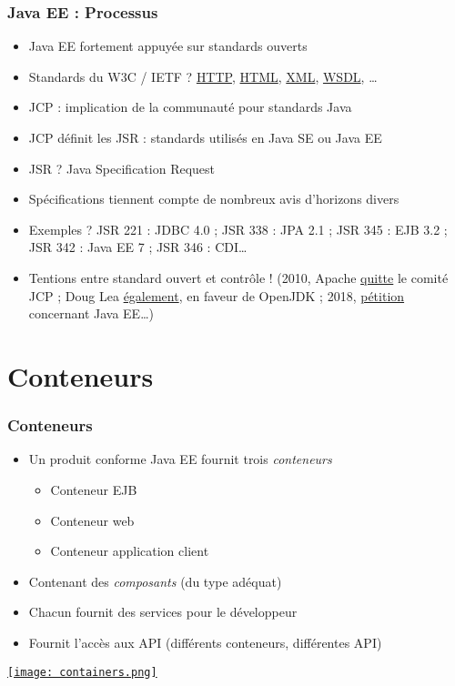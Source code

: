 \documentclass[english, french]{beamer}
\begin{document}
\begin{frame}
	\frametitle{Java EE : Processus}
	\begin{itemize}
		\item Java EE fortement appuyée sur standards ouverts
		\item Standards du W3C / IETF ?\pause{} \href{http://www.w3.org/Protocols/}{HTTP}, \href{http://www.w3.org/html/}{HTML}, \href{http://www.w3.org/XML/}{XML}, \href{http://www.w3.org/TR/wsdl/}{WSDL}, …\pause
		\item JCP : implication de \og{}la communauté\fg{} pour standards Java
		\item JCP définit les JSR : standards utilisés en Java SE ou Java EE
		\item JSR ? \pause Java Specification Request \pause
		\item Spécifications tiennent compte de nombreux avis d’horizons divers
		\item Exemples ? \pause JSR 221 : JDBC 4.0 ; JSR 338 : JPA 2.1 ; JSR 345 : EJB 3.2 ; JSR 342 : Java EE 7 ; JSR 346 : CDI… \pause
		\item Tentions entre standard ouvert et contrôle ! (2010, Apache \href{https://blogs.apache.org/foundation/entry/the_asf_resigns_from_the}{quitte} le comité JCP ; Doug Lea \href{http://gee.cs.oswego.edu/dl/html/jcp22oct10.html}{également}, en faveur de OpenJDK ; 2018, \href{https://www.change.org/p/larry-ellison-tell-oracle-to-move-forward-java-ee-as-a-critical-part-of-the-global-it-industry/u/22463163}{pétition} concernant Java EE…)
	\end{itemize}
\end{frame}

\section{Conteneurs}
\begin{frame}
	\frametitle{Conteneurs}
	\begin{itemize}
		\item Un produit conforme Java EE fournit trois \emph{conteneurs}
		\begin{itemize}
			\item Conteneur EJB
			\item Conteneur web
			\item Conteneur application client
		\end{itemize}
		\item Contenant des \emph{composants} (du type adéquat)
		\item Chacun fournit des services pour le développeur
		\item Fournit l’accès aux API (différents conteneurs, différentes API)
	\end{itemize}
	\href{https://docs.oracle.com/javaee/7/tutorial/overview007.htm}{\texttt{[image: containers.png]}}
\end{frame}
\end{document}
